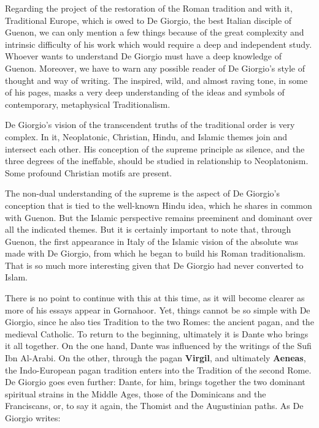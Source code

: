 \begin{quotationx}
Regarding the project of the restoration of the Roman tradition and with it, Traditional Europe, which is owed to De Giorgio, the best Italian disciple of Guenon, we can only mention a few things because of the great complexity and intrinsic difficulty of his work which would require a deep and independent study. Whoever wants to understand De Giorgio must have a deep knowledge of Guenon. Moreover, we have to warn any possible reader of De Giorgio's style of thought and way of writing. The inspired, wild, and almost raving tone, in some of his pages, masks a very deep understanding of the ideas and symbols of contemporary, metaphysical Traditionalism.

De Giorgio's vision of the transcendent truths of the traditional order is very complex. In it, Neoplatonic, Christian, Hindu, and Islamic themes join and intersect each other. His conception of the supreme principle as silence, and the three degrees of the ineffable, should be studied in relationship to Neoplatonism. Some profound Christian motifs are present.

The non-dual understanding of the supreme is the aspect of De Giorgio's conception that is tied to the well-known Hindu idea, which he shares in common with Guenon. But the Islamic perspective remains preeminent and dominant over all the indicated themes. But it is certainly important to note that, through Guenon, the first appearance in Italy of the Islamic vision of the absolute was made with De Giorgio, from which he began to build his Roman traditionalism. That is so much more interesting given that De Giorgio had never converted to Islam.
\end{quotationx}


There is no point to continue with this at this time, as it will become clearer as more of his essays appear in Gornahoor. Yet, things cannot be so simple with De Giorgio, since he also ties Tradition to the two Romes: the ancient pagan, and the medieval Catholic. To return to the beginning, ultimately it is Dante who brings it all together. On the one hand, Dante was influenced by the writings of the Sufi Ibn Al-Arabi. On the other, through the pagan \textbf{Virgil}, and ultimately \textbf{Aeneas}, the Indo-European pagan tradition enters into the Tradition of the second Rome. De Giorgio goes even further: Dante, for him, brings together the two dominant spiritual strains in the Middle Ages, those of the Dominicans and the Franciscans, or, to say it again, the Thomist and the Augustinian paths. As De Giorgio writes:

